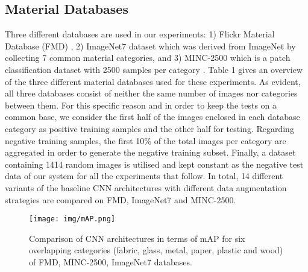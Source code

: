 \documentclass[a4paper,twoside]{article}
\begin{document}
\subsection{Material Databases}
\noindent Three different databases are used in our experiments: 1) Flickr Material Database (FMD) \cite{13}, 2) ImageNet7 dataset \cite{15} which was derived from ImageNet \cite{23} by collecting 7 common material categories, and 3) MINC-2500 which is a patch classification dataset with 2500 samples per category \cite{24}. Table 1 gives an overview of the three different material databases used for these experiments. As evident, all three databases consist of neither the same number of images nor categories between them. For this specific reason and in order to keep the tests on a common base, we consider the first half of the images enclosed in each database category as positive training samples and the other half for testing. Regarding negative training samples, the first 10\% of the total images per category are aggregated in order to generate the negative training subset. Finally, a dataset \cite{21} containing 1414 random images is utilised and kept constant as the negative test data of our system for all the experiments that follow. In total, 14 different variants of the baseline CNN architectures with different data augmentation strategies are compared on FMD, ImageNet7 and MINC-2500.

\begin{figure*}[t]
\centering
\texttt{[image: img/mAP.png]}
\caption{Comparison of CNN architectures in terms of mAP for six overlapping categories (fabric, glass, metal, paper, plastic and wood) of FMD, MINC-2500, ImageNet7 databases.}
\label{mAP}
\end{figure*}
\end{document}
